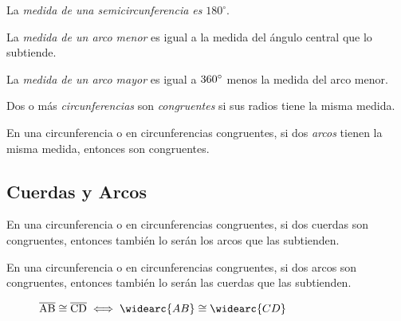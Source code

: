 \begin{definition}
    La \textit{medida de una semicircunferencia es} $180^{\circ}$.
\end{definition}

\begin{definition}
    La \textit{medida de un arco menor} es igual a la medida del ángulo central que lo subtiende.
\end{definition}

\begin{definition}
    La \textit{medida de un arco mayor} es igual a $360^{\circ}$ menos la medida del arco menor.
\end{definition}


\begin{definition}
    Dos o más \textit{circunferencias} son \textit{congruentes} si sus radios tiene la misma medida.
\end{definition}

\begin{definition}
    En una circunferencia o en circunferencias congruentes, si dos \textit{arcos} tienen la misma medida, entonces son congruentes.
\end{definition}

\clearpage

\subsection{Cuerdas y Arcos}

\begin{theorem}
    En una circunferencia o en circunferencias congruentes, si dos cuerdas son congruentes, entonces también lo serán los arcos que las subtienden.
\end{theorem}

\begin{theorem}
    En una circunferencia o en circunferencias congruentes, si dos arcos son congruentes, entonces también lo serán las cuerdas que las subtienden.
\end{theorem}

\begin{figure}[!h]
    \centering
    
    \caption{$\seg{AB} \cong \seg{CD} \iff \widearc{AB} \cong \widearc{CD}$}
    \label{fig:congruentes-arcos-cuerdas}
\end{figure}

